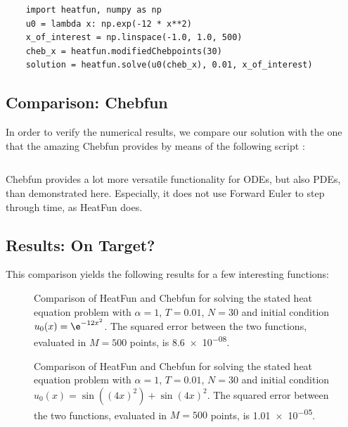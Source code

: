 \documentclass[12pt, a4paper]{article}
\newcommand{\heatfun}{\textcolor{themecolor3}{HeatFun}\xspace}
\begin{document}
  \begin{verbatim}
    import heatfun, numpy as np
    u0 = lambda x: np.exp(-12 * x**2)
    x_of_interest = np.linspace(-1.0, 1.0, 500)
    cheb_x = heatfun.modifiedChebpoints(30)
    solution = heatfun.solve(u0(cheb_x), 0.01, x_of_interest)
  \end{verbatim}

  \subsection{Comparison: Chebfun}
  In order to verify the numerical results, we compare our solution with the one that the amazing Chebfun provides by means of the following script \parencite{exploring}:
  \inputminted{matlab}{../analysis/heatfun.m}

  Chebfun provides a lot more versatile functionality for ODEs, but also PDEs, than demonstrated here.
  Especially, it does not use Forward Euler to step through time, as \heatfun does.


  \pagebreak
  \subsection{Results: On Target?}
  This comparison yields the following results for a few interesting functions:

  \begin{figure}[H]
    \centering
    \caption{Comparison of \heatfun and Chebfun for solving the stated heat equation problem with $\alpha = 1$, $T = 0.01$, $N = 30$ and initial condition $u_0(x) = \e^{-12 x^2}$. The squared error between the two functions, evaluated in $M = 500$ points, is \num{8.6e-08}.}
    \label{fig:example1}
  \end{figure}

  \begin{figure}[H]
    \centering
    \caption{Comparison of \heatfun and Chebfun for solving the stated heat equation problem with $\alpha = 1$, $T = 0.01$, $N = 30$ and initial condition $u_0(x) = \sin((4x)^2) + \sin(4x)^2$. The squared error between the two functions, evaluated in $M = 500$ points, is \num{1.01e-05}.}
    \label{fig:example2}
  \end{figure}
\end{document}
